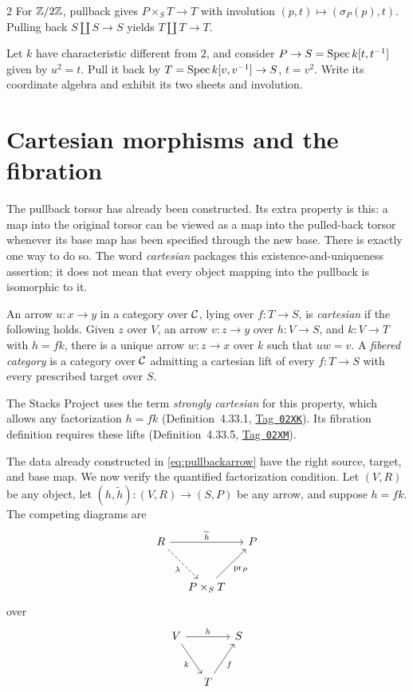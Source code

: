 \documentclass[12pt]{memoir}
\newcommand{\BGtag}[1]{\href{https://stacks.math.columbia.edu/tag/#1}{Tag~\texttt{#1}}}
\begin{document}
\begin{multicols}{2}
For $\mathbb{Z}/2\mathbb{Z}$, pullback gives $P\times_S T\to T$ with involution
$(p,t)\mapsto(\sigma_P(p),t)$. Pulling back $S\amalg S\to S$ yields
$T\amalg T\to T$.

\begin{Ej}\label{ex:pullback}
Let $k$ have characteristic different from $2$, and consider
$P\to S=\operatorname{Spec} k[t,t^{-1}]$ given by $u^2=t$.
Pull it back by $T=\operatorname{Spec} k[v,v^{-1}]\to S$, $t=v^2$.
Write its coordinate algebra and exhibit its two sheets and involution.
\end{Ej}

\section{Cartesian morphisms and the fibration}\label{sec:cartesian}

The pullback torsor has already been constructed. Its extra property
is this: a map into the original torsor can be viewed as a map into the
pulled-back torsor whenever its base map has been specified through the
new base. There is exactly one way to do so. The word \emph{cartesian}
packages this existence-and-uniqueness assertion; it does not mean that
every object mapping into the pullback is isomorphic to it.

\begin{Def}\label{def:cartesian}
An arrow $u:x\to y$ in a category over $\mathcal{C}$, lying over $f:T\to S$,
is \emph{cartesian} if the following holds. Given $z$ over $V$, an arrow
$v:z\to y$ over $h:V\to S$, and $k:V\to T$ with $h=fk$, there is a
unique arrow $w:z\to x$ over $k$ such that $uw=v$.
A \emph{fibered category} is a category over $\mathcal{C}$ admitting a
cartesian lift of every $f:T\to S$ with every prescribed target over $S$.
\end{Def}
The Stacks Project uses the term \emph{strongly cartesian} for this
property, which allows any factorization $h=fk$
(Definition~4.33.1, \BGtag{02XK}). Its fibration definition requires
these lifts (Definition~4.33.5, \BGtag{02XM}).

The data already constructed in \eqref{eq:pullbackarrow} have the right
source, target, and base map. We now verify the quantified factorization
condition. Let $(V,R)$ be any object, let
$(h,\widetilde h):(V,R)\to(S,P)$ be any arrow, and suppose $h=fk$.
The competing diagrams are
\[
\begin{tikzcd}[column sep=small,row sep=large]
R \arrow[rr,"\widetilde h"] \arrow[dr,dashed,"\lambda"'] && P\\
& P\times_S T \arrow[ur,"\pr_P"'] &
\end{tikzcd}
\]
over
\[
\begin{tikzcd}[column sep=small,row sep=large]
V \arrow[rr,"h"] \arrow[dr,"k"'] && S\\
& T \arrow[ur,"f"'] &
\end{tikzcd}
\]


\end{multicols}
\end{document}
